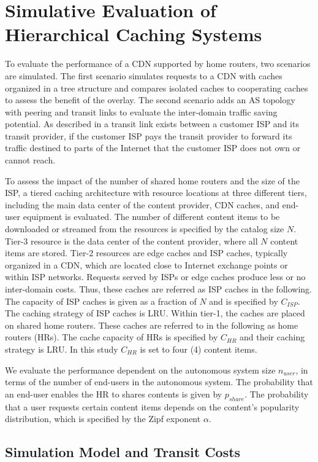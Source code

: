 \section{Simulative Evaluation of Hierarchical Caching Systems}\label{sec:hierarchical:simulative:simulative}

To evaluate the performance of a CDN supported by home routers, two scenarios are simulated. The first scenario simulates requests to a CDN with caches organized in a tree structure and compares isolated caches to cooperating caches to assess the benefit of the overlay.
The second scenario adds an AS topology with peering and transit links to evaluate the inter-domain traffic saving potential. As described in  a transit link exists between a customer ISP and its transit provider, if the customer ISP pays the transit provider to forward its traffic destined to parts of the Internet that the customer ISP does not own or cannot reach.


To assess the impact of the number of shared home routers and the size of the ISP, a tiered caching architecture with resource locations at three different tiers, including the main data center of the content provider, CDN caches, and end-user equipment is evaluated.
The number of different content items to be downloaded or streamed from the resources is specified by the catalog size $N$. Tier-3 resource is the data center of the content provider, where all $N$ content items are stored. Tier-2 resources are edge caches and ISP caches, typically organized in a CDN, which are located close to Internet exchange points or within ISP networks. Requests served by ISPs or edge caches produce less or no inter-domain costs. Thus, these caches are referred as ISP caches in the following. The capacity of ISP caches is given as a fraction of $N$ and is specified by $C_{ISP}$. The caching strategy of ISP caches is LRU.
Within tier-1, the caches are placed on shared home routers. These caches are referred to in the following as home routers (HRs). The cache capacity of HRs is specified by $C_{HR}$ and their caching strategy is LRU. In this study $C_{HR}$ is set to four (4) content items.

We evaluate the performance dependent on the autonomous system size $n_{user}$, in terms of the number of end-users in the autonomous system. The probability that an end-user enables the HR to shares contents is given by $p_{share}$. The probability that a user requests certain content items depends on the content's popularity distribution, which is specified by the Zipf exponent $\alpha$.

\subsection{Simulation Model and Transit Costs}\label{sec:simeval}
